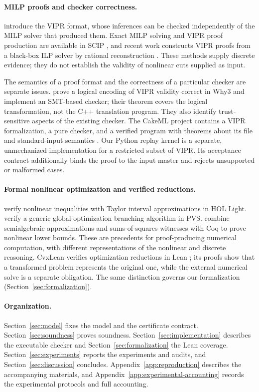 \paragraph{MILP proofs and checker correctness.}
\citet{cheung2017-vipr} introduce the VIPR format, whose inferences can be checked independently of the MILP solver that produced them. Exact MILP solving and VIPR proof production are available in SCIP \citep{hojny2025-the-scip-optimization-suite-10}, and recent work constructs VIPR proofs from a black-box ILP solver by rational reconstruction \citep{szeider2026-blackbox-vipr}. These methods supply discrete evidence; they do not establish the validity of nonlinear cuts supplied as input.

The semantics of a proof format and the correctness of a particular checker are separate issues. \citet{wood2026-vipr-smt} prove a logical encoding of VIPR validity correct in Why3 and implement an SMT-based checker; their theorem covers the logical transformation, not the C++ translation program. They also identify trust-sensitive aspects of the existing checker. The CakeML project contains a VIPR formalization, a pure checker, and a verified program with theorems about its file and standard-input semantics \citep{cakeml2026-vipr}. Our Python replay kernel is a separate, unmechanized implementation for a restricted subset of VIPR. Its acceptance contract additionally binds the proof to the input master and rejects unsupported or malformed cases.

\paragraph{Formal nonlinear optimization and verified reductions.}
\citet{solovyev2013-formal-verification-of-nonlinear-inequalities} verify nonlinear inequalities with Taylor interval approximations in HOL Light. \citet{narkawicz2014-a-formally-verified-generic-branching} verify a generic global-optimization branching algorithm in PVS. \citet{magron2015-formal} combine semialgebraic approximations and sums-of-squares witnesses with Coq to prove nonlinear lower bounds. These are precedents for proof-producing numerical computation, with different representations of the nonlinear and discrete reasoning. CvxLean verifies optimization reductions in Lean \citep{bentkamp2023-verified-reductions-for-optimization}; its proofs show that a transformed problem represents the original one, while the external numerical solve is a separate obligation. The same distinction governs our formalization (Section~\ref{sec:formalization}).

\paragraph{Organization.}
Section~\ref{sec:model} fixes the model and the certificate contract. Section~\ref{sec:soundness} proves soundness. Section~\ref{sec:implementation} describes the executable checker and Section~\ref{sec:formalization} the Lean coverage. Section~\ref{sec:experiments} reports the experiments and audits, and Section~\ref{sec:discussion} concludes. Appendix~\ref{app:reproduction} describes the accompanying materials, and Appendix~\ref{app:experimental-accounting} records the experimental protocols and full accounting.

